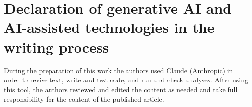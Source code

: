 \section*{Declaration of generative AI and AI-assisted technologies in the writing process}
During the preparation of this work the authors used Claude (Anthropic) in order to revise text, write and test code, and run and check analyses. After using this tool, the authors reviewed and edited the content as needed and take full responsibility for the content of the published article.
